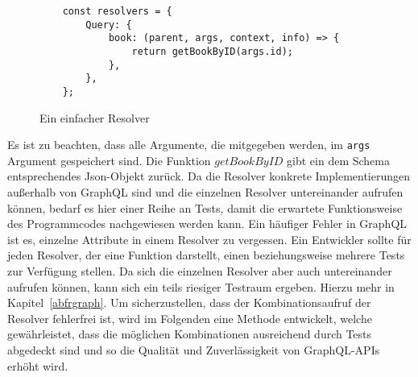 \begin{figure}[htb]
    \begin{verbatim}
    const resolvers = {
        Query: {
            book: (parent, args, context, info) => {
                return getBookByID(args.id);
            },
        },
    };
    \end{verbatim}
    \caption{Ein einfacher Resolver}
    \label{simpleresolver}
\end{figure}

Es ist zu beachten, dass alle Argumente, die mitgegeben werden, im \verb+args+ Argument gespeichert sind.
Die Funktion $getBookByID$ gibt ein dem Schema entsprechendes Json-Objekt zurück.
Da die Resolver konkrete Implementierungen außerhalb von GraphQL sind und die einzelnen Resolver untereinander aufrufen können, bedarf es hier
einer Reihe an Tests, damit die erwartete Funktionsweise des Programmcodes nachgewiesen werden kann.
Ein häufiger Fehler in GraphQL ist es, einzelne Attribute in einem Resolver zu vergessen.
Ein Entwickler sollte für jeden Resolver, der eine Funktion darstellt, einen beziehungsweise mehrere Tests zur Verfügung stellen.
Da sich die einzelnen Resolver aber auch untereinander aufrufen können, kann sich ein teils riesiger Testraum ergeben.
Hierzu mehr in Kapitel~\ref{abfrgraph}.
Um sicherzustellen, dass der Kombinationsaufruf der Resolver fehlerfrei ist, wird im Folgenden eine Methode entwickelt, welche gewährleistet,
dass die möglichen Kombinationen ausreichend durch Tests abgedeckt sind und so die Qualität und Zuverlässigkeit von GraphQL-APIs erhöht wird.
